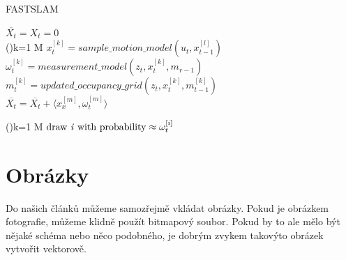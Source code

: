 \documentclass[a4paper,11pt, hidelinks]{article}
\begin{document}
\begin{algorithm}
\caption{F{\footnotesize AST}SLAM}
\label{algo:1}
\SetAlgoNoLine
\SetNlSty{}{}{:}


\BlankLine

$\overline{X_t} = X_t = 0$ \\
\For(){k=1  M}{
    $x_t^{[k]} = sample\_motion\_model(u_t,x_{t-1}^{[l]})$ \\
    $\omega_t^{[k]} = measurement\_model(z_t,x_t^{[k]},m_{r-1})$ \\
    $m_t^{[k]} = updated\_occupancy\_grid(z_t,x_t^{[k]},m_{t-1}^{[k]})$ \\
    $\overline{X_t} = \overline{X_t} + \langle x_x^{[m]}, \omega_t^{[m]} \rangle$
}

\For(){k=1  M}{
    $\mbox{draw \emph{i} with probability} \approx \omega_t^{[i]}$ \\
}

\end{algorithm}

\section{Obrázky}
Do našich článků můžeme samozřejmě vkládat obrázky. Pokud je obrázkem fotografie, můžeme klidně použít bitmapový soubor. Pokud by to ale mělo být nějaké schéma nebo něco podobného, je dobrým zvykem takovýto obrázek vytvořit vektorově.
\end{document}
